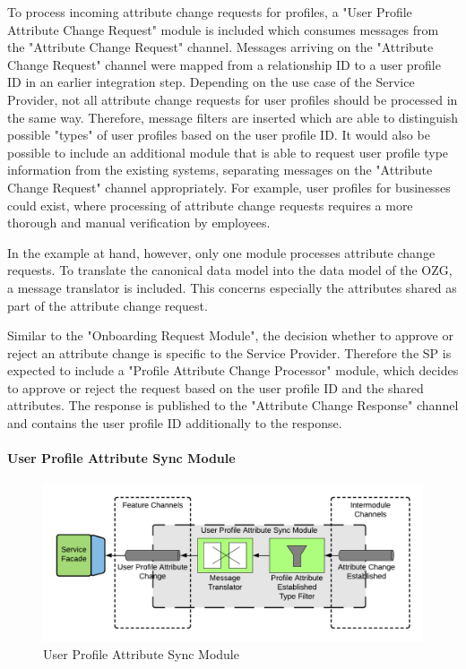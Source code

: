 To process incoming attribute change requests for profiles, a "User Profile Attribute Change Request" module is included which consumes messages from the "Attribute Change Request" channel. Messages arriving on the "Attribute Change Request" channel were mapped from a relationship ID to a user profile ID in an earlier integration step. Depending on the use case of the Service Provider, not all attribute change requests for user profiles should be processed in the same way. Therefore, message filters are inserted which are able to distinguish possible "types" of user profiles based on the user profile ID. It would also be possible to include an additional module that is able to request user profile type information from the existing systems, separating messages on the "Attribute Change Request" channel appropriately. For example, user profiles for businesses could exist, where processing of attribute change requests requires a more thorough and manual verification by employees. 

In the example at hand, however, only one module processes attribute change requests. To translate the canonical data model into the data model of the OZG, a message translator is included. This concerns especially the attributes shared as part of the attribute change request.

Similar to the "Onboarding Request Module", the decision whether to approve or reject an attribute change is specific to the Service Provider. Therefore the SP is expected to include a "Profile Attribute Change Processor" module, which decides to approve or reject the request based on the user profile ID and the shared attributes. The response is published to the "Attribute Change Response" channel and contains the user profile ID additionally to the response.

\paragraph{User Profile Attribute Sync Module}

\begin{figure}[h!]
    \centering
    \includegraphics[scale=0.6]{Diagrams/Integration Architecture 1/Technological Integration/13. User Profile Attribute Sync Module.pdf}
    \caption{User Profile Attribute Sync Module}
    \label{integration1:user_profile_attribute_sync_module}
\end{figure}

